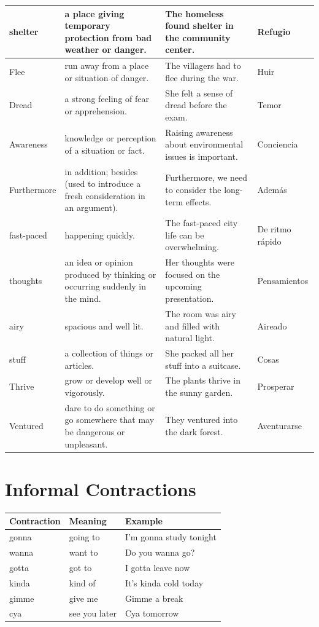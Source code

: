 \begin{longtable}{p{}p{}p{}p{}}
\hline
shelter & a place giving temporary protection from bad weather or danger. & The homeless found shelter in the community center. & Refugio \\
\hline
Flee & run away from a place or situation of danger. & The villagers had to flee during the war. & Huir \\
\hline
Dread & a strong feeling of fear or apprehension. & She felt a sense of dread before the exam. & Temor \\
\hline
Awareness & knowledge or perception of a situation or fact. & Raising awareness about environmental issues is important. & Conciencia \\
\hline
Furthermore & in addition; besides (used to introduce a fresh consideration in an argument). & Furthermore, we need to consider the long-term effects. & Además \\
\hline
fast-paced & happening quickly. & The fast-paced city life can be overwhelming. & De ritmo rápido \\
\hline
thoughts & an idea or opinion produced by thinking or occurring suddenly in the mind. & Her thoughts were focused on the upcoming presentation. & Pensamientos \\
\hline
airy & spacious and well lit. & The room was airy and filled with natural light. & Aireado \\
\hline
stuff & a collection of things or articles. & She packed all her stuff into a suitcase. & Cosas \\
\hline
Thrive & grow or develop well or vigorously. & The plants thrive in the sunny garden. & Prosperar \\
\hline
Ventured & dare to do something or go somewhere that may be dangerous or unpleasant. & They ventured into the dark forest. & Aventurarse \\
\hline

\end{longtable}


\section{Informal Contractions}
\begin{longtable}{lll}
\textbf{Contraction} & \textbf{Meaning} & \textbf{Example} \\
\hline
\endhead
gonna & going to & I'm gonna study tonight \\
wanna & want to & Do you wanna go? \\
gotta & got to & I gotta leave now \\
kinda & kind of & It's kinda cold today \\
gimme & give me & Gimme a break \\
cya & see you later & Cya tomorrow \\
\end{longtable}
    
